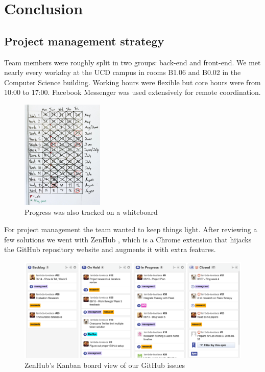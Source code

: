 \documentclass{article}
\begin{document}
\section{Conclusion} %

\subsection{Project management strategy} %
Team members were roughly split in two groups: back-end and front-end. We met nearly every workday at the UCD campus in rooms B1.06 and B0.02 in the Computer Science building. Working hours were flexible but core hours were from 10:00 to 17:00. Facebook Messenger \cite{messenger} was used extensively for remote coordination.

\begin{figure}[H]
    \centering
    \includegraphics[width=0.35\textwidth]{whiteboard2}
    \caption{Progress was also tracked on a whiteboard}
\end{figure}

For project management the team wanted to keep things light. After reviewing a few solutions \cite{ll-blog-week2} we went with ZenHub \cite{zenhub}, which is a Chrome extension that hijacks the GitHub repository website and augments it with extra features.

\begin{figure}[H]
    \centering
    \includegraphics[width=\textwidth]{kanbanboard}
    \caption{ZenHub's Kanban board view of our GitHub issues}
\end{figure}
\end{document}
